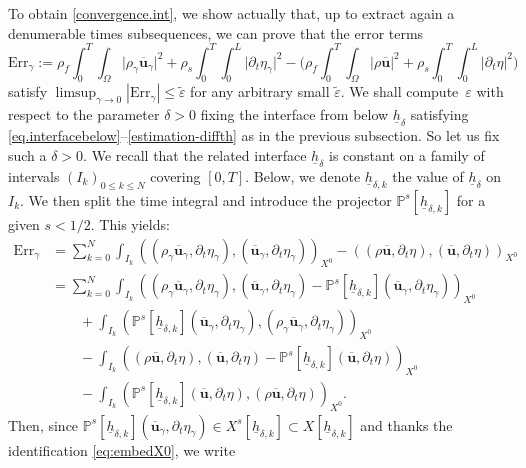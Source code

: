 \documentclass[11pt]{article}
\newcommand{\Err}{\mathrm{Err}}
\theoremstyle{remark}
\theoremstyle{definition}
\newcommand{\ug}{\boldsymbol{u}}
\let\CM\Omega
\newcommand{\hb}{{\underline{h}}}
\begin{document}
To obtain \eqref{convergence.int}, we show actually that, up to extract again a denumerable times subsequences, we can prove that the error terms
\[
\Err_{\gamma} := \rho_{f}\int_{0}^{T}\!\!\int_{\CM}\vert \rho_{\gamma}\overline{\ug}_{\gamma}\vert^{2}+\rho_{s}\int_{0}^{T}\!\!\int_{0}^{L}\vert\partial_{t}\eta_{\gamma}\vert^{2}
- \biggl( \rho_{f}\int_{0}^{T}\!\!\int_{\CM}\vert \rho\overline{\ug}\vert^{2}+\rho_{s}\int_{0}^{T}\!\!\int_{0}^{L}\vert\partial_{t}\eta\vert^{2} \biggr)
\]
satisfy $\limsup_{\gamma \to 0} |\Err_{\gamma}| \leq \tilde\varepsilon$ for any arbitrary small $\tilde\varepsilon$. We shall compute~$\varepsilon$ with respect to the parameter $\delta >0$ fixing the interface from below $\hb_{\delta}$ satisfying
\eqref{eq.interfacebelow}--\eqref{estimation-diffth} as in the previous subsection. So let us fix such a $\delta >0$.
We recall that the related interface $\hb_{\delta}$
is constant on a family of intervals $(I_k)_{0 \leq k \leq N}$ covering $[0,T]$. Below, we denote $\hb_{\delta,k}$ the value
of $\hb_{\delta}$ on $I_k$. We then split the time integral and introduce the projector $\mathbb P^s[\hb_{\delta,k}]$
for a given $s < 1/2$. This yields:
\begin{align*}
\Err_{\gamma} & = \sum_{k=0}^N \int_{I_{k}} ( (\rho_{\gamma} \overline{\ug}_{\gamma},\partial_t \eta_{\gamma}),( \overline{\ug}_{\gamma},\partial_t \eta_{\gamma}))_{X^0} - ( (\rho \overline{\ug},\partial_t \eta),( \overline{\ug},\partial_t \eta))_{X^0} \\
& = \sum_{k=0}^N \int_{I_{k}} ( (\rho_{\gamma} \overline{\ug}_{\gamma},\partial_t\eta_{\gamma}),( \overline{\ug}_{\gamma},\partial_t \eta_{\gamma})- \mathbb{P}^{s}[\hb_{\delta, k}](\overline{\ug}_{\gamma},\partial_{t}\eta_{\gamma}))_{X^0} \\
& \qquad + \int_{I_{k}} ( \mathbb{P}^{s}[\hb_{\delta, k}](\overline{\ug}_{\gamma},\partial_{t}\eta_{\gamma}),(\rho_{\gamma} \overline{\ug}_{\gamma},\partial_t \eta_{\gamma}))_{X^0} \\
& \qquad - \int_{I_{k}} ( (\rho \overline{\ug},\partial_t \eta),( \overline{\ug},\partial_t \eta)- \mathbb{P}^{s}[\hb_{\delta, k}](\overline{\ug},\partial_{t}\eta))_{X^0} \\
& \qquad - \int_{I_{k}} ( \mathbb{P}^{s}[\hb_{\delta, k}](\overline{\ug},\partial_{t}\eta),(\rho \overline{\ug},\partial_t \eta))_{X^0}.
\end{align*}
Then, since $\mathbb P^s[\hb_{\delta,k}](\overline{\ug}_\gamma,\partial_t \eta_\gamma) \in X^s[\hb_{\delta,k}]\subset X[\hb_{\delta,k}] $ and thanks the identification \eqref{eq:embedX0}, we write
\end{document}

